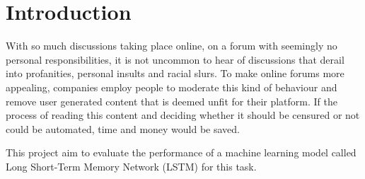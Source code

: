\chapter{Introduction}
With so much discussions taking place online, on a forum with
seemingly no personal responsibilities, it is not uncommon to hear of
discussions that derail into profanities, personal insults and racial
slurs. To make online forums more appealing, companies employ people
to moderate this kind of behaviour and remove user generated content
that is deemed unfit for their platform. If the process of reading
this content and deciding whether it should be censured or not could
be automated, time and money would be saved.

This project aim to evaluate the performance of a machine learning
model called Long Short-Term Memory Network (LSTM) for this task. 